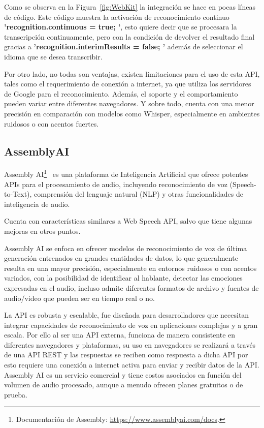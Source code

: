 \documentclass[a4paper, 12pt]{book}
\begin{document}
Como se observa en la Figura~\ref{fig:WebKit} la integración se hace en pocas líneas de código. Este código muestra la activación de reconocimiento continuo \textbf{'recognition.continuous = true; '}, esto quiere decir que se procesara la transcripción continuamente, pero con la condición de devolver el resultado final gracias a \textbf{'recognition.interimResults = false; '} además de seleccionar el idioma que se desea transcribir.

Por otro lado, no todas son ventajas, existen limitaciones para el uso de esta API, tales como el requerimiento de conexión a internet, ya que utiliza los servidores de Google para el reconocimiento. Además, el soporte y el comportamiento pueden variar entre diferentes navegadores. Y sobre todo, cuenta con una menor precisión en comparación con modelos como Whisper, especialmente en ambientes ruidosos o con acentos fuertes.


\subsection{AssemblyAI}

Assembly AI\footnote{Documentación de Assembly: \url{https://www.assemblyai.com/docs}.}~\cite{assemblyai_about} es una plataforma de Inteligencia Artificial que ofrece potentes APIs para el procesamiento de audio, incluyendo reconocimiento de voz (Speech-to-Text), comprensión del lenguaje natural (NLP) y otras funcionalidades de inteligencia de audio.

Cuenta con características similares a Web Speech API, salvo que tiene algunas mejoras en otros puntos.

Assembly AI se enfoca en ofrecer modelos de reconocimiento de voz de última generación entrenados en grandes cantidades de datos, lo que generalmente resulta en una mayor precisión, especialmente en entornos ruidosos o con acentos variados, con la posibilidad de identificar al hablante, detectar las emociones expresadas en el audio, incluso admite diferentes formatos de archivo y fuentes de audio/video que pueden ser en tiempo real o no.

La API es robusta y escalable, fue diseñada para desarrolladores que necesitan integrar capacidades de reconocimiento de voz en aplicaciones complejas y a gran escala. Por ello al ser una API externa, funciona de manera consistente en diferentes navegadores y plataformas, su uso en navegadores se realizará a través de una API REST y las respuestas se reciben como respuesta a dicha API por esto requiere una conexión a internet activa para enviar y recibir datos de la API. Assembly AI es un servicio comercial y tiene costos asociados en función del volumen de audio procesado, aunque a menudo ofrecen planes gratuitos o de prueba.
\end{document}
